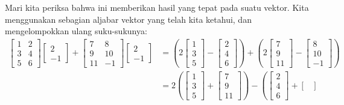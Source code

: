 Mari kita periksa bahwa ini memberikan hasil yang tepat pada suatu vektor. Kita menggunakan sebagian
aljabar vektor yang telah kita ketahui, dan
mengelompokkan ulang suku-sukunya:
\begin{equation*}
\begin{split}
\begin{bmatrix}
1 & 2 \\
3 & 4 \\
5 & 6
\end{bmatrix}
\begin{bmatrix}
2 \\ -1
\end{bmatrix}
+
\begin{bmatrix}
7 & 8 \\
9 & 10 \\
11 & -1
\end{bmatrix}
\begin{bmatrix}
2 \\ -1
\end{bmatrix}
& =
\left(
2
\begin{bmatrix}
1 \\
3 \\
5
\end{bmatrix}
-
\begin{bmatrix}
2 \\
4 \\
6
\end{bmatrix}
\right)
+
\left(
2
\begin{bmatrix}
7 \\
9 \\
11
\end{bmatrix}
-
\begin{bmatrix}
8 \\
10 \\
-1
\end{bmatrix}
\right)
\\
& =
2
\left(
\begin{bmatrix}
1 \\
3 \\
5
\end{bmatrix}
+
\begin{bmatrix}
7 \\
9 \\
11
\end{bmatrix}
\right)
-
\left(
\begin{bmatrix}
2 \\
4 \\
6
\end{bmatrix}
+
\begin{bmatrix}

\end{bmatrix}
\end{split}
\end{equation*}

